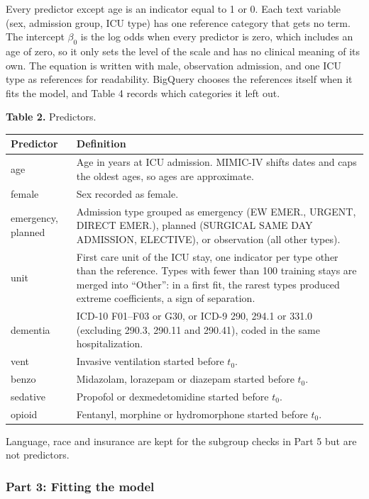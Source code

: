 \documentclass[10pt]{article}
\begin{document}
Every predictor except age is an indicator equal to 1 or 0. Each text variable (sex, admission group, ICU type) has one reference category that gets no term. The intercept $\beta_0$ is the log odds when every predictor is zero, which includes an age of zero, so it only sets the level of the scale and has no clinical meaning of its own. The equation is written with male, observation admission, and one ICU type as references for readability. BigQuery chooses the references itself when it fits the model, and Table 4 records which categories it left out.

\textbf{Table 2.} Predictors.
\begin{center}
	\begin{tabular}{@{} l p{} @{}}
	\toprule
	Predictor			& Definition \\
	\midrule
	age					& Age in years at ICU admission. MIMIC-IV shifts dates and caps the oldest ages, so ages are approximate. \\
	female				& Sex recorded as female. \\
	emergency, planned	& Admission type grouped as emergency (EW EMER., URGENT, DIRECT EMER.), planned (SURGICAL SAME DAY ADMISSION, ELECTIVE), or observation (all other types). \\
	unit				& First care unit of the ICU stay, one indicator per type other than the reference. Types with fewer than 100 training stays are merged into ``Other'': in a first fit, the rarest types produced extreme coefficients, a sign of separation. \\
	dementia			& ICD-10 F01--F03 or G30, or ICD-9 290, 294.1 or 331.0 (excluding 290.3, 290.11 and 290.41), coded in the same hospitalization. \\
	vent				& Invasive ventilation started before $t_0$. \\
	benzo				& Midazolam, lorazepam or diazepam started before $t_0$. \\
	sedative			& Propofol or dexmedetomidine started before $t_0$. \\
	opioid				& Fentanyl, morphine or hydromorphone started before $t_0$. \\
	\bottomrule
	\end{tabular}
\end{center}

Language, race and insurance are kept for the subgroup checks in Part 5 but are not predictors.



\subsubsection*{Part 3: Fitting the model}
\end{document}

